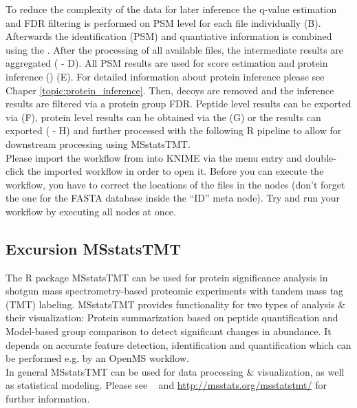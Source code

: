 \noindent To reduce the complexity of the data for later inference the q-value estimation and FDR filtering is performed on PSM level for each file individually (B). Afterwards the identification (PSM) and quantiative information is combined using the . After the processing of all available files, the intermediate results are aggregated ( - D). All PSM results are used for score estimation and protein inference () (E). For detailed information about protein inference please see Chaper \ref{topic:protein_inference}. Then, decoys are removed and the inference results are filtered via a protein group FDR. Peptide level results can be exported via  (F), protein level results can be obtained via the  (G) or the results can exported ( - H) and further processed with the following R pipeline to allow for downstream processing using MSstatsTMT. \\

\noindent Please import the workflow from  into KNIME via the menu entry  and double-click the imported workflow in order to open it. Before you can execute the workflow, you have to correct the locations of the files in the  nodes (don't forget the one for the FASTA database inside the ``ID'' meta node). Try and run your workflow by executing all nodes at once.

\subsection{Excursion MSstatsTMT}
The R package MSstatsTMT can be used for protein significance analysis in shotgun mass spectrometry-based proteomic experiments with tandem mass tag (TMT) labeling. MSstatsTMT provides functionality for two types of analysis \& their visualization: Protein summarization based on peptide quantification and Model-based group comparison to detect significant changes in abundance. It depends on accurate feature detection, identification and quantification which can be performed e.g. by an OpenMS workflow. \\

\noindent In general MSstatsTMT can be used for data processing \& visualization, as well as statistical modeling. Please see ~\cite{Huang2020} and \url{http://msstats.org/msstatstmt/} for further information. \\

